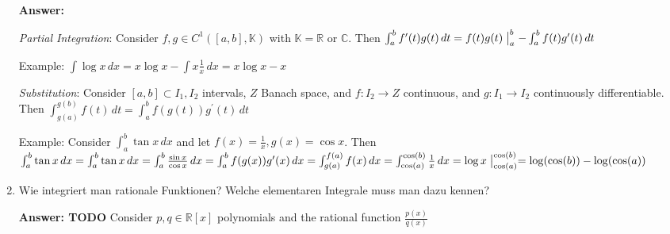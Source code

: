 \documentclass[11pt]{article}
\newcommand{\RR}[0]{\mathbb{R}}
\newcommand{\CC}[0]{\mathbb{C}}
\newcommand{\KK}[0]{\mathbb{K}}
\begin{document}
\begin{enumerate}
    \textbf{Answer:}

    \textit{Partial Integration}: Consider $f, g \in C^1([a, b], \KK)$ with $\KK = \RR$ or $\CC$. Then $\int_a^b f^\prime(t) g(t)\,dt = f(t) g(t)\bigm|_a^b - \int_a^b f(t) g^\prime(t)\,dt$

    Example: $\int \log{x} \,dx = x \log{x} - \int x \frac{1}{x} \,dx = x \log{x} - x$

    \textit{Substitution}: Consider $[a, b] \subset I_1, I_2$ intervals, $Z$ Banach space, and $f: I_2 \to Z$ continuous, and $g\colon I_1 \to I_2$ continuously differentiable. Then $\int_{g(a)}^{g(b)} f(t)\,dt = \int_a^b f(g(t)) g^\prime(t) \,dt$

    Example: Consider $\int_a^b \tan{x} \,dx$ and let $f(x) = \frac{1}{x}, g(x) = \cos{x}$. Then $\int_a^b \tan{x} \,dx = \int_a^b \tan{x}\,dx = \int_a^b \frac{\sin{x}}{\cos{x}}\,dx = \int_a^b f(g(x)) g^\prime(x) \,dx = \int_{g(a)}^{f(a)} f(x) \,dx = \int_{\cos(a)}^{\cos(b)} \frac{1}{x}\,dx = \log{x}\bigm|_{\cos(a)}^{\cos(b)} = \log(\cos(b)) - \log(\cos(a))$

    \item Wie integriert man rationale Funktionen? Welche elementaren Integrale muss man dazu kennen?

    \textbf{Answer: TODO} Consider $p, q \in \RR\!\left[x\right]$ polynomials and the rational function $\frac{p(x)}{q(x)}$


\end{enumerate}
\end{document}
